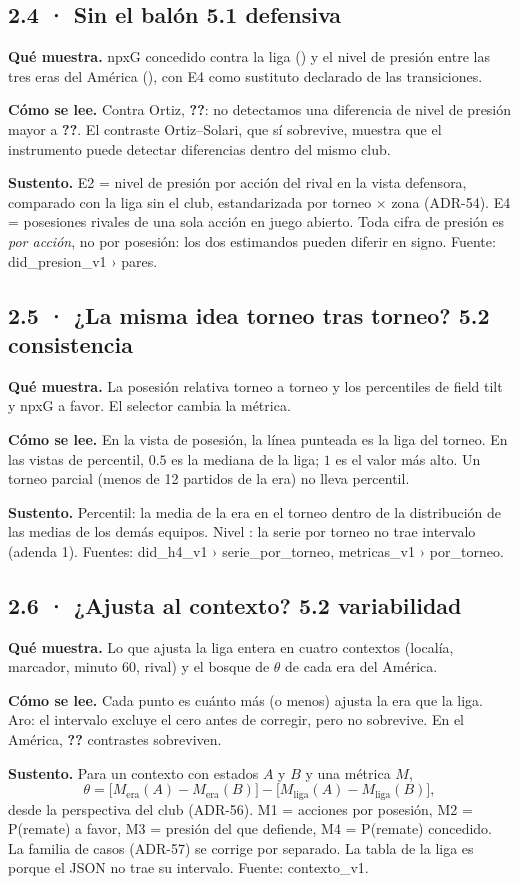 \documentclass[11pt,a4paper]{article}
\newcommand{\cifraPresJOic}{\textbf{??}}\newcommand{\cifraPresMargen}{\textbf{??}}%
\newcommand{\cifraCtxRech}{\textbf{??}}\newcommand{\cifraRotJ}{\textbf{??}}%
\newcommand{\nivel}[1]{\fbox{\footnotesize\textbf{#1}}}
\newcommand{\fuente}[1]{{\small\ttfamily #1}}
\newcommand{\bloque}[3]{\par\textbf{Qué muestra.} #1\par\textbf{Cómo se lee.} #2\par\textbf{Sustento.} #3\par}
\begin{document}
\subsection*{2.4 · Sin el balón \hfill{\normalfont\small 5.1 defensiva}}
\bloque{npxG concedido contra la liga (\nivel{B}) y el nivel de presión entre las
tres eras del América (\nivel{A}), con E4 como sustituto declarado de las
transiciones.}
{Contra Ortiz, \cifraPresJO{} \cifraPresJOic: no detectamos una diferencia de
nivel de presión mayor a \cifraPresMargen. El contraste Ortiz--Solari, que sí
sobrevive, muestra que el instrumento puede detectar diferencias dentro del
mismo club.}
{E2 = nivel de presión por acción del rival en la vista defensora, comparado
con la liga sin el club, estandarizada por torneo $\times$ zona (ADR-54).
E4 = posesiones rivales de una sola acción en juego abierto. Toda cifra de
presión es \emph{por acción}, no por posesión: los dos estimandos pueden
diferir en signo. Fuente: \fuente{did\_presion\_v1 › pares}.}

\subsection*{2.5 · ¿La misma idea torneo tras torneo? \hfill{\normalfont\small 5.2 consistencia}}
\bloque{La posesión relativa torneo a torneo y los percentiles de field tilt y
npxG a favor. El selector cambia la métrica.}
{En la vista de posesión, la línea punteada es la liga del torneo. En las
vistas de percentil, $0.5$ es la mediana de la liga; $1$ es el valor más alto.
Un torneo parcial (menos de 12 partidos de la era) no lleva percentil.}
{Percentil: la media de la era en el torneo dentro de la distribución de las
medias de los demás equipos. Nivel \nivel{C}: la serie por torneo no trae
intervalo (adenda 1). Fuentes: \fuente{did\_h4\_v1 › serie\_por\_torneo},
\fuente{metricas\_v1 › por\_torneo}.}

\subsection*{2.6 · ¿Ajusta al contexto? \hfill{\normalfont\small 5.2 variabilidad}}
\bloque{Lo que ajusta la liga entera en cuatro contextos (localía, marcador,
minuto 60, rival) y el bosque de $\theta$ de cada era del América.}
{Cada punto es cuánto más (o menos) ajusta la era que la liga. Aro: el
intervalo excluye el cero antes de corregir, pero no sobrevive. En el América,
\cifraCtxRech{} contrastes sobreviven.}
{Para un contexto con estados $A$ y $B$ y una métrica $M$,
\[
\theta = \big[M_{\text{era}}(A) - M_{\text{era}}(B)\big] - \big[M_{\text{liga}}(A) - M_{\text{liga}}(B)\big],
\]
desde la perspectiva del club (ADR-56). M1 = acciones por posesión, M2 =
P(remate) a favor, M3 = presión del que defiende, M4 = P(remate) concedido.
La familia de casos (ADR-57) se corrige por separado. La tabla de la liga es
\nivel{C} porque el JSON no trae su intervalo. Fuente: \fuente{contexto\_v1}.}
\end{document}
